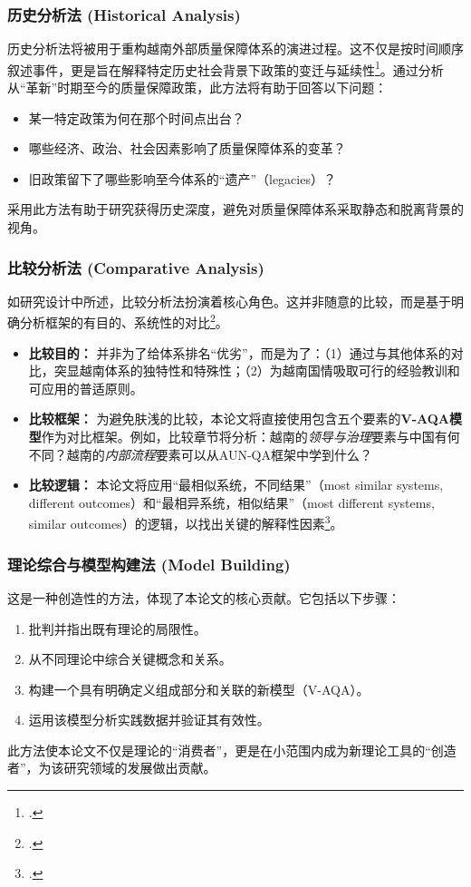 \subsubsection{历史分析法 (Historical Analysis)}
\label{subsubsec:phan_tich_lich_su}
历史分析法将被用于重构越南外部质量保障体系的演进过程。这不仅是按时间顺序叙述事件，更是旨在解释特定历史社会背景下政策的变迁与延续性\footcite{Tosh2015}。通过分析从“革新”时期至今的质量保障政策，此方法将有助于回答以下问题：
\begin{itemize}
    \item 某一特定政策为何在那个时间点出台？
    \item 哪些经济、政治、社会因素影响了质量保障体系的变革？
    \item 旧政策留下了哪些影响至今体系的“遗产”（legacies）？
\end{itemize}
采用此方法有助于研究获得历史深度，避免对质量保障体系采取静态和脱离背景的视角。

\subsubsection{比较分析法 (Comparative Analysis)}
\label{subsubsec:phan_tich_so_sanh}
如研究设计中所述，比较分析法扮演着核心角色。这并非随意的比较，而是基于明确分析框架的有目的、系统性的对比\footcite{Sartori1991}。
\begin{itemize}
    \item \textbf{比较目的：} 并非为了给体系排名“优劣”，而是为了：（1）通过与其他体系的对比，突显越南体系的独特性和特殊性；（2）为越南国情吸取可行的经验教训和可应用的普适原则。
    \item \textbf{比较框架：} 为避免肤浅的比较，本论文将直接使用包含五个要素的\textbf{V-AQA模型}作为对比框架。例如，比较章节将分析：越南的\textit{领导与治理}要素与中国有何不同？越南的\textit{内部流程}要素可以从AUN-QA框架中学到什么？
    \item \textbf{比较逻辑：} 本论文将应用“最相似系统，不同结果”（most similar systems, different outcomes）和“最相异系统，相似结果”（most different systems, similar outcomes）的逻辑，以找出关键的解释性因素\footcite{PrzeworskiTeune1970}。
\end{itemize}

\subsubsection{理论综合与模型构建法 (Model Building)}
\label{subsubsec:xay_dung_mo_hinh}
这是一种创造性的方法，体现了本论文的核心贡献。它包括以下步骤：
\begin{enumerate}
    \item 批判并指出既有理论的局限性。
    \item 从不同理论中综合关键概念和关系。
    \item 构建一个具有明确定义组成部分和关联的新模型（V-AQA）。
    \item 运用该模型分析实践数据并验证其有效性。
\end{enumerate}
此方法使本论文不仅是理论的“消费者”，更是在小范围内成为新理论工具的“创造者”，为该研究领域的发展做出贡献。

